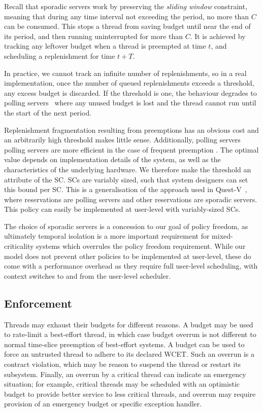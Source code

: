 Recall that sporadic servers work by preserving the
\emph{sliding window} constraint, meaning that during any time
interval not exceeding the period, no more than $C$ can be consumed.
This stops a thread from saving budget until near the end of its
period, and then running uninterrupted for more than $C$. It is achieved by tracking any leftover
budget when
a thread is preempted at time \(t\), and scheduling a replenishment for time  $t+T$.

In practice, we cannot track an infinite number of
replenishments, so in a real implementation, once the number of
queued replenishments exceeds a threshold, any excess budget is
discarded. If the threshold is one, the behaviour degrades to polling
servers~\citep{Sprunt_SL_89a} where any unused budget is lost and the
thread cannot run until the start of the next period. 

Replenishment fragmentation resulting from preemptions has an obvious cost 
and an arbitrarily high threshold makes little sense. Additionally, polling servers
polling servers are more efficient in the
case of frequent preemption \citep{Li_WCM_14}. The optimal value depends on
implementation details of the system, as well as the characteristics
of the underlying hardware. We therefore make the threshold an attribute of the SC. \glspl{SC} are variably sized,
such that system designers can set this bound per SC. This is a generalisation of the approach used
in Quest-V~\citep{Danish_LW_11}, where \IO reservations are polling servers and other reservations 
are sporadic servers. This policy can easily be implemented at user-level with variably-sized
\glspl{SC}.

The choice of sporadic servers is a concession to our goal of policy freedom, as ultimately temporal
isolation is a more important requirement for mixed-criticality systems which overrules the policy
freedom requirement. While our model does not prevent other policies to be implemented at user-level, these
do come with a performance overhead as they require full user-level scheduling, with context
switches to and from the user-level scheduler.

\subsection{Enforcement}
\label{sec:model-enforcement}

Threads may exhaust their budgets for different reasons. A budget may
be used to rate-limit a best-effort thread, in which case budget
overrun is not different to normal time-slice preemption of
best-effort systems. A budget can be used to force an untrusted thread
to adhere to its declared WCET. Such an overrun is a contract violation, which may be reason
to suspend the thread or restart its subsystem. Finally, an overrun by
a critical thread can indicate an emergency situation; for example,
critical threads may be scheduled with an optimistic budget to provide
better service to less critical threads, and overrun may require
provision of an emergency budget or specific exception handler.

